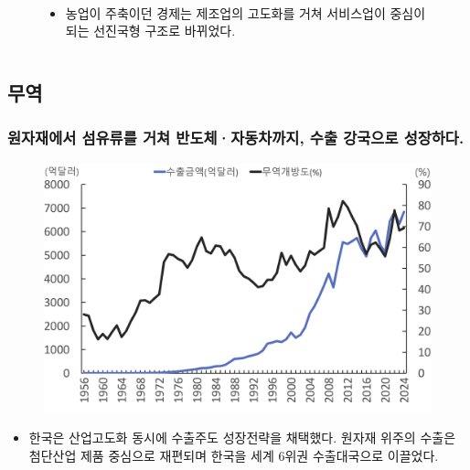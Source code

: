 \documentclass[aspectratio=169,xcolor=dvipsnames,handout]{beamer}
\begin{document}
\begin{frame}
\begin{columns}
\begin{column}{.5\textwidth}
\begin{figure}
            \\
            \begin{itemize}[<+->]
                \item 농업이 주축이던 경제는 제조업의 고도화를 거쳐 서비스업이 중심이 되는 선진국형 구조로 바뀌었다.
            \end{itemize}
        \end{figure}
    \end{column}
\end{columns}
\end{frame}

\subsection{무역}
\begin{frame}[<+->]
\frametitle{원자재에서 섬유류를 거쳐 반도체·자동차까지, 수출 강국으로 성장하다.}
    \begin{figure}
        \centering
        \includegraphics[width=.5\textwidth]{pic/fig_econ_05.png}
    \end{figure}
    \begin{itemize}
        \item 한국은 산업고도화 동시에 수출주도 성장전략을 채택했다. 원자재 위주의 수출은 첨단산업 제품 중심으로 재편되며 한국을 세계 6위권 수출대국으로 이끌었다.
    \end{itemize}
\end{frame}
\end{document}
